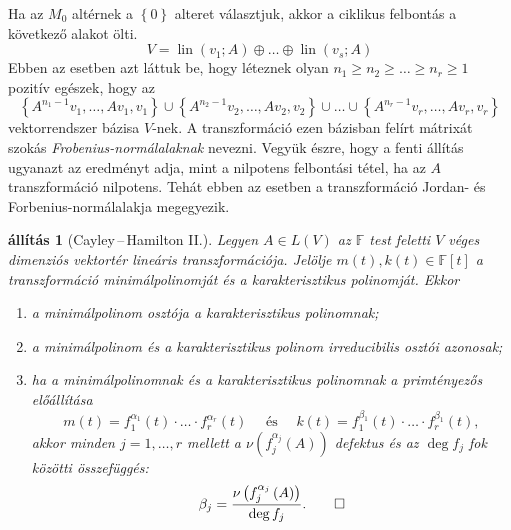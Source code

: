 \documentclass[a4paper, showtrims]{memoir}
\theoremstyle{plain}
\newtheorem{proposition}{állítás}[chapter]
\theoremstyle{remark}
\theoremstyle{definition}
\DeclareMathOperator{\lin}{lin}
\begin{document}
Ha az $M_0$ altérnek a $\left\{ 0 \right\}$ alteret választjuk, akkor a ciklikus felbontás a következő alakot ölti.	
\[
V=
        \lin\left( v_1;A \right)
        \oplus\ldots\oplus
        \lin\left( v_s;A \right)
\]
Ebben az esetben azt láttuk be, hogy léteznek olyan $n_1\geq n_2\geq \dots\geq n_r\geq 1$ pozitív egészek, hogy az
\[
		\left\{ A^{n_1-1}v_1,\ldots,Av_1,v_1 \right\}
		\cup
		\left\{ A^{n_2-1}v_2,\ldots,Av_2,v_2 \right\}
		\cup
		\ldots
		\cup
		\left\{ A^{n_r-1}v_r,\ldots,Av_r,v_r \right\}
		\tag{\dag}
	\]
vektorrendszer bázisa $V$-nek. A transzformáció ezen bázisban felírt mátrixát szokás \textit{Frobenius-normálalaknak} nevezni. Vegyük észre, hogy a fenti állítás ugyanazt az eredményt adja, mint a nilpotens felbontási tétel, ha az $A$ transzformáció nilpotens. Tehát ebben az esetben a transzformáció Jordan- és Forbenius-normálalakja megegyezik.
\begin{proposition}[Cayley\,--\,Hamilton II.]
    Legyen $A\in L\left( V \right)$ az $\mathbb{F}$ test feletti $V$ véges dimenziós vektortér
    lineáris transzformációja.
    Jelölje $m\left( t \right), k\left( t \right)\in\mathbb{F}\left[ t \right]$
    a transzformáció minimálpolinomját és a karakterisztikus polinomját.
    Ekkor
    \begin{enumerate}
        \item a minimálpolinom osztója a karakterisztikus polinomnak;
        \item a minimálpolinom és a karakterisztikus polinom irreducibilis osztói azonosak;
        \item ha a minimálpolinomnak és a karakterisztikus polinomnak a primtényezős előállítása
            \[
                m\left( t \right)
                =
                f_1^{\alpha_1}\left( t \right)
                \cdot\ldots\cdot
                f_r^{\alpha_r}\left( t \right)
                \quad\text{ és }\quad
                k\left( t \right)
                =
                f_1^{\beta_1}\left( t \right)
                \cdot\ldots\cdot
                f_r^{\beta_1}\left( t \right),
            \]
            akkor minden $j=1,\ldots,r$ mellett a $\nu\left( f_j^{\alpha_j} \left( A \right)\right)$ defektus
            és az $\deg f_j$ fok közötti összefüggés:
            \[
                \beta_j
                =
                \frac{\nu\left( f_j^{\alpha_j}\left( A \right) \right)}{\deg f_j}.
                \qedhere
            \]
    \end{enumerate}
\end{proposition}
\end{document}
